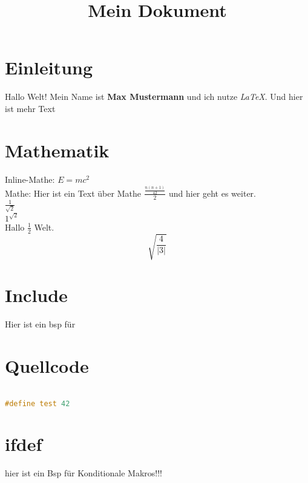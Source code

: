 \documentclass{article}
\title{Mein Dokument}
\author{}
\begin{document}
\maketitle

\section{Einleitung}
Hallo Welt! 
Mein Name ist \textbf{Max Mustermann} und ich nutze \textit{LaTeX}.
Und hier ist mehr Text

\section{Mathematik}
Inline-Mathe: $E = mc^2$  \\
Mathe: Hier ist ein Text über Mathe \(\frac{\frac{n(n+1)}{ 42}}{ 2}\) und hier geht es weiter.\\  

\(\frac{1}{ \sqrt{2}}\) \\

\({1}^{ \sqrt{2}}\) \\

Hallo \(\frac{1}{ 2}\) Welt.  
\[\sqrt{\frac{4}{ \left|3\right|}}\]

\section{Include}
Hier ist ein bsp für 

\section{Quellcode}

\begin{lstlisting}[language=c++]

#define test 42

\end{lstlisting}


\section{ifdef}
hier ist ein Bsp für Konditionale Makros!!!
\end{document}
